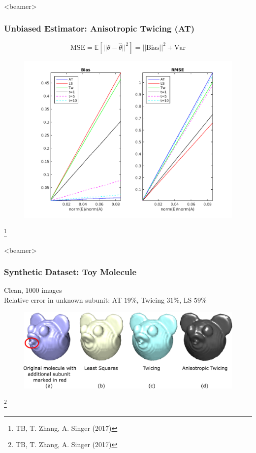 \documentclass{beamer}
\newcommand\blfootnote[1]{%
  \begingroup
  \renewcommand\thefootnote{}\footnote{#1}%
  \addtocounter{footnote}{-1}%
  \endgroup
}
\begin{document}
\begin{frame}<beamer>
\frametitle{Unbiased Estimator: Anisotropic Twicing (AT) }
\begin{equation}
\label{eqn:biasvar}
\text{MSE}=\mathbb{E}[||\theta-\hat{\theta}||^2] = ||\text{Bias}||^2 + \text{Var} \nonumber
\end{equation}
\begin{figure}[!htbp]
\begin{center}
\includegraphics[scale=0.35]{figures/anis_bias_family.png}
\end{center}
\end{figure}\blfootnote{TB, T. Zhang, A. Singer (2017)}
\end{frame}

\begin{frame}<beamer>
\frametitle{Synthetic Dataset: Toy Molecule }
Clean, $1000$ images\\
Relative error in unknown subunit: AT $19\%$, Twicing $31\%$, LS $59\%$ 
\begin{figure}[!htbp]
\begin{center}
\includegraphics[scale=0.16]{figures/mickey.pdf}
\end{center}
\end{figure}\blfootnote{TB, T. Zhang, A. Singer (2017)}

\end{frame}
\end{document}
